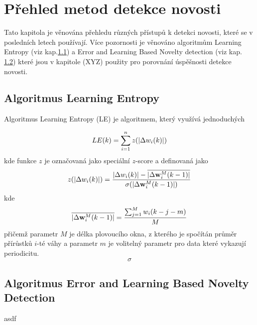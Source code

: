 \chapter{Přehled metod detekce novosti}
Tato kapitola je věnována přehledu různých přístupů k detekci novosti, které se v posledních letech používají. Více pozornosti je věnováno algoritmům Learning Entropy (viz kap.\ref{chap:LE}) a Error and Learning Based Novelty detection (viz kap. \ref{chap:elbnd}) které jsou v kapitole (XYZ) použity pro porovnání úspěšnosti detekce novosti.
\section{Algoritmus Learning Entropy}\label{chap:LE}
Algoritmus Learning Entropy (LE) je algoritmem, který využívá jednoduchých 

\begin{equation}
LE(k)=\sum_{i=1}^n z(\lvert\Delta w_i(k)\rvert)
\end{equation}
kde funkce $z$ je označovaná jako speciální $z$-score a definovaná jako
\begin{equation}
z(\lvert\Delta w_i(k)\rvert) = \frac{\lvert\Delta w_i(k)\rvert-\overline{\lvert\Delta\textbf{w}_i^M(k-1)\rvert}}{\sigma(\lvert\Delta \textbf{w}_i^M(k-1)\rvert)}
\end{equation}
kde
\begin{equation}
\overline{\lvert\Delta \textbf{w}_i^M(k-1)\rvert}=\frac{\sum_{j=1}^M w_i(k-j-m)}{M}
\end{equation} 
přičemž parametr $M$ je délka plovoucího okna, z kterého je spočítán průměr přírůstků $i$-té váhy a parametr $m$ je volitelný parametr pro data které vykazují periodicitu.
\begin{equation}
\sigma
\end{equation}

\section{Algoritmus Error and Learning Based Novelty Detection}\label{chap:elbnd}
asdf